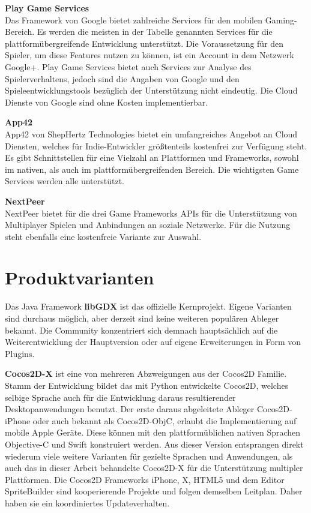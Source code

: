 \bigskip
\textbf{Play Game Services} \\
Das Framework von Google bietet zahlreiche Services für den mobilen Gaming-Bereich. Es werden die meisten in der Tabelle genannten Services für die plattformübergreifende Entwicklung unterstützt. Die Voraussetzung für den Spieler, um diese Features nutzen zu können, ist ein Account in dem Netzwerk Google+. Play Game Services bietet auch Services zur Analyse des Spielerverhaltens, jedoch sind die Angaben von Google und den Spieleentwicklungstools bezüglich der Unterstützung nicht eindeutig. Die Cloud Dienste von Google sind ohne Kosten implementierbar. \citep{play_game_services}

\bigskip
\textbf{App42} \\
App42 von ShepHertz Technologies bietet ein umfangreiches Angebot an Cloud Diensten, welches für Indie-Entwickler größtenteils kostenfrei zur Verfügung steht. Es gibt Schnittstellen für eine Vielzahl an Plattformen und Frameworks, sowohl im nativen, als auch im plattformübergreifenden Bereich. Die wichtigsten Game Services werden alle unterstützt. \citep{app42}

\bigskip
\textbf{NextPeer} \\
NextPeer bietet für die drei Game Frameworks APIs für die Unterstützung von Multiplayer Spielen und Anbindungen an soziale Netzwerke. Für die Nutzung steht ebenfalls eine kostenfreie Variante zur Auswahl. \citep{nextpeer}


\section{Produktvarianten}
Das Java Framework \textbf{libGDX} ist das offizielle Kernprojekt. Eigene Varianten sind durchaus möglich, aber derzeit sind keine weiteren populären Ableger bekannt. Die Community konzentriert sich demnach hauptsächlich auf die Weiterentwicklung der Hauptversion oder auf eigene Erweiterungen in Form von Plugins.

\bigskip
\textbf{Cocos2D-X} ist eine von mehreren Abzweigungen aus der Cocos2D Familie. Stamm der Entwicklung bildet das mit Python entwickelte Cocos2D, welches selbige Sprache auch für die Entwicklung daraus resultierender Desktopanwendungen benutzt. Der erste daraus abgeleitete Ableger Cocos2D-iPhone oder auch bekannt als Cocos2D-ObjC, erlaubt die Implementierung auf mobile Apple Geräte. Diese können mit den plattformüblichen nativen Sprachen Objective-C und Swift konstruiert werden. Aus dieser Version entsprangen direkt wiederum viele weitere Varianten für gezielte Sprachen und Anwendungen, als auch das in dieser Arbeit behandelte Cocos2D-X für die Unterstützung multipler Plattformen. Die Cocos2D Frameworks iPhone, X, HTML5 und dem Editor SpriteBuilder sind kooperierende Projekte und folgen demselben Leitplan. Daher haben sie ein koordiniertes Updateverhalten. \citep{cocos2d_relationships}


